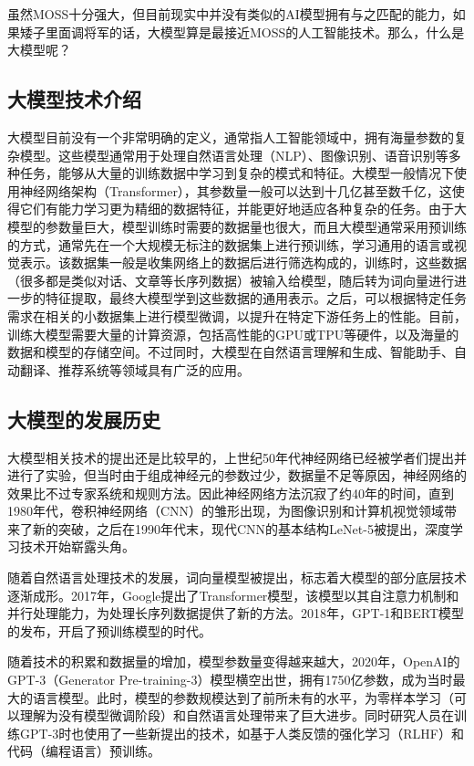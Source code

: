 虽然MOSS十分强大，但目前现实中并没有类似的AI模型拥有与之匹配的能力，如果矮子里面调将军的话，大模型算是最接近MOSS的人工智能技术。那么，什么是大模型呢？

\subsection{大模型技术介绍}

大模型目前没有一个非常明确的定义，通常指人工智能领域中，拥有海量参数的复杂模型。这些模型通常用于处理自然语言处理（NLP）、图像识别、语音识别等多种任务，能够从大量的训练数据中学习到复杂的模式和特征。大模型一般情况下使用神经网络架构（Transformer），其参数量一般可以达到十几亿甚至数千亿，这使得它们有能力学习更为精细的数据特征，并能更好地适应各种复杂的任务。由于大模型的参数量巨大，模型训练时需要的数据量也很大，而且大模型通常采用预训练的方式，通常先在一个大规模无标注的数据集上进行预训练，学习通用的语言或视觉表示。该数据集一般是收集网络上的数据后进行筛选构成的，训练时，这些数据（很多都是类似对话、文章等长序列数据）被输入给模型，随后转为词向量进行进一步的特征提取，最终大模型学到这些数据的通用表示。之后，可以根据特定任务需求在相关的小数据集上进行模型微调，以提升在特定下游任务上的性能。目前，训练大模型需要大量的计算资源，包括高性能的GPU或TPU等硬件，以及海量的数据和模型的存储空间。不过同时，大模型在自然语言理解和生成、智能助手、自动翻译、推荐系统等领域具有广泛的应用。

\subsection{大模型的发展历史}
大模型相关技术的提出还是比较早的，上世纪50年代神经网络已经被学者们提出并进行了实验，但当时由于组成神经元的参数过少，数据量不足等原因，神经网络的效果比不过专家系统和规则方法。因此神经网络方法沉寂了约40年的时间，直到1980年代，卷积神经网络（CNN）的雏形出现，为图像识别和计算机视觉领域带来了新的突破，之后在1990年代末，现代CNN的基本结构LeNet-5被提出，深度学习技术开始崭露头角。

随着自然语言处理技术的发展，词向量模型被提出，标志着大模型的部分底层技术逐渐成形。2017年，Google提出了Transformer模型，该模型以其自注意力机制和并行处理能力，为处理长序列数据提供了新的方法。2018年，GPT-1和BERT模型的发布，开启了预训练模型的时代。

随着技术的积累和数据量的增加，模型参数量变得越来越大，2020年，OpenAI的GPT-3（Generator Pre-training-3）模型横空出世，拥有1750亿参数，成为当时最大的语言模型。此时，模型的参数规模达到了前所未有的水平，为零样本学习（可以理解为没有模型微调阶段）和自然语言处理带来了巨大进步。同时研究人员在训练GPT-3时也使用了一些新提出的技术，如基于人类反馈的强化学习（RLHF）和代码（编程语言）预训练。

